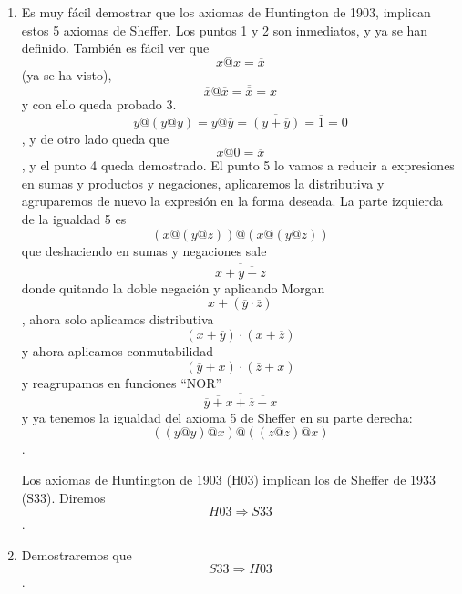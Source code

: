 \begin{enumerate}
\begin{enumerate}
\begin{enumerate}
\begin{enumerate}
        \begin{enumerate}
        \def\labelenumv{\arabic{enumv}.}
        \tightlist
        \item
          \[{\#\left( B \right)} \geq 2\]
        \item
          \[{{\cdot @} \cdot}:{{B \times B}\rightarrow B}\forall x,{y \in B}\exists!{z \in B}x@{y = z}\]
        \item
          \[\forall{x \in B}{({x@x})}@{{({x@x})} = x}\]
        \item
          \[\forall x,{y \in B}x@{{({y@{({y@y})}})} = x}@x\]
        \item
          \[\forall x,y,{z \in B}{({x@{({y@z})}})}@{{({x@{({y@z})}})} = {({{({y@y})}@x})}}@{({{({z@z})}@x})}\]
        \end{enumerate}
      \item
        Es muy fácil demostrar que los axiomas de Huntington de 1903,
        implican estos 5 axiomas de Sheffer. Los puntos 1 y 2 son
        inmediatos, y ya se han definido. También es fácil ver que
        \[x@{x = \overline{x}}\] (ya se ha visto),
        \[\overline{x}@{{\overline{x} = \overline{\overline{x}}} = x}\]y
        con ello queda probado
        3.\[y@{{({y@y})} = y}@{{{\overline{y} = \overline{({y+\overline{y}})}} = \overline{1}} = 0}\],
        y de otro lado queda que \[x@{0 = \overline{x}}\], y el punto 4
        queda demostrado. El punto 5 lo vamos a reducir a expresiones en
        sumas y productos y negaciones, aplicaremos la distributiva y
        agruparemos de nuevo la expresión en la forma deseada. La parte
        izquierda de la igualdad 5 es
        \[{({x@{({y@z})}})}@{({x@{({y@z})}})}\]que deshaciendo en sumas
        y negaciones sale\[\overline{\overline{x+\overline{y+z}}}\]donde
        quitando la doble negación y aplicando
        Morgan\[x + {({\overline{y} \cdot \overline{z}})}\], ahora solo
        aplicamos
        distributiva\[{({x + \overline{y}})} \cdot {({x + \overline{z}})}\]
        y ahora aplicamos
        conmutabilidad\[{({\overline{y} + x})} \cdot {({\overline{z} + x})}\]y
        reagrupamos en funciones
        ``NOR''\[\overline{\overline{\overline{y}+x}+\overline{\overline{z}+x}}\]y
        ya tenemos la igualdad del axioma 5 de Sheffer en su parte
        derecha:\[{({{({y@y})}@x})}@{({{({z@z})}@x})}\].

        Los axiomas de Huntington de 1903 (H03) implican los de Sheffer
        de 1933 (S33). Diremos \[\mathit{H03}\Rightarrow\mathit{S33}\].
      \item
        Demostraremos que \[\mathit{S33}\Rightarrow\mathit{H03}\].


\end{enumerate}
\end{enumerate}
\end{enumerate}
\end{enumerate}
